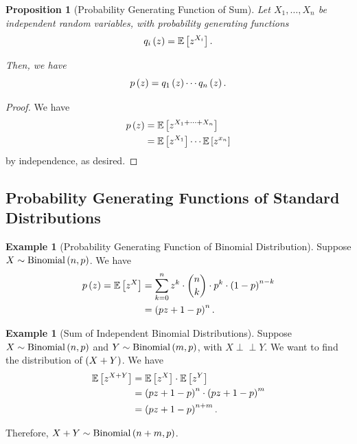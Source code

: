 \documentclass{article}
\newtheorem{proposition}[theorem]{Proposition}
\theoremstyle{definition}
\newtheorem{example}[theorem]{Example}
\theoremstyle{remark}
\newcommand{\Expt}{\mathbb{E}}
\newcommand{\indp}{\mathrel{\perp\!\!\!\perp}}
\newcommand{\Binomial}{\operatorname{Binomial}}
\begin{document}
\begin{proposition}[Probability Generating Function of Sum]
    \label{prop:pgf-sum}%
    Let \(X_1, \ldots, X_n\) be independent random variables, with probability generating functions
    \[
        q_i\pqty{z} = \Expt\bqty{z^{X_i}}.
    \]

    Then, we have
    \[
        p\left(z\right) = q_1\left(z\right) \cdots q_n\left(z\right).
    \]
\end{proposition}

\begin{proof}
    We have
    \begin{align*}
        p\pqty{z} &= \Expt\bqty{z^{X_1 + \cdots + X_n}} \\
        &= \Expt\bqty{z^{X_1}} \cdots \Expt\bqty{z^{x_n}}
    \end{align*}
    by independence, as desired.
\end{proof}

\subsection{Probability Generating Functions of Standard Distributions}

\begin{example}[Probability Generating Function of Binomial Distribution]
    \label{ex:pgf-binomial}%
    Suppose \(X \sim \Binomial\pqty{n, p}\). We have
    \begin{align*}
        p\pqty{z} = \Expt\bqty{z^X} &= \sum_{k = 0}^{n} z^k \cdot \binom{n}{k} \cdot p^k \cdot \pqty{1 - p}^{n - k} \\
        &= \pqty{pz + 1 - p}^n.
    \end{align*}
\end{example}

\begin{example}[Sum of Independent Binomial Distributions]
    \label{ex:sum-binomial}%
    Suppose \(X \sim \Binomial\pqty{n, p}\) and \(Y \sim \Binomial\pqty{m, p}\), with \(X \indp Y\). We want to find the distribution of \(\left(X + Y\right)\). We have
    \begin{align*}
        \Expt\bqty{z^{X + Y}} &= \Expt\bqty{z^X} \cdot \Expt\bqty{z^Y} \\
        &= \pqty{pz + 1 - p}^{n} \cdot \pqty{pz + 1 - p}^{m} \\
        &= \pqty{pz + 1 - p}^{n + m}.
    \end{align*}

    Therefore, \(X + Y \sim \Binomial\pqty{n + m, p}\).
\end{example}
\end{document}
